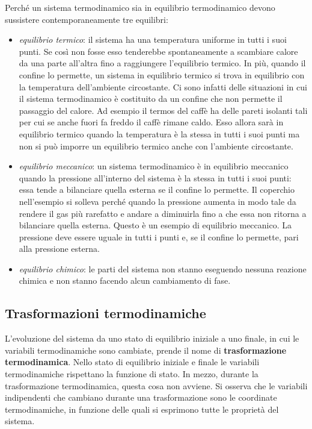 Perché un sistema termodinamico sia in equilibrio termodinamico devono sussistere contemporaneamente tre equilibri:

\begin{itemize}
	\item \emph{equilibrio termico}: il sistema ha una temperatura uniforme in tutti i suoi punti. Se così non fosse esso tenderebbe spontaneamente a scambiare calore da una parte all'altra fino a raggiungere l'equilibrio termico. In più, quando il confine lo permette, un sistema in equilibrio termico si trova in equilibrio con la temperatura dell'ambiente circostante. Ci sono infatti delle situazioni in cui il sistema termodinamico è costituito da un confine che non permette il passaggio del calore. Ad esempio il termos del caffè ha delle pareti isolanti tali per cui se anche fuori fa freddo il caffè rimane caldo. Esso allora sarà in equilibrio termico quando la temperatura è la stessa in tutti i suoi punti ma non si può imporre un equilibrio termico anche con l'ambiente circostante.
	\item \emph{equilibrio meccanico}: un sistema termodinamico è in equilibrio meccanico quando la pressione all'interno del sistema è la stessa in tutti i suoi punti: essa tende a bilanciare quella esterna se il confine lo permette. Il coperchio nell'esempio si solleva perché quando la pressione aumenta in modo tale da rendere il gas più rarefatto e andare a diminuirla fino a che essa non ritorna a bilanciare quella esterna. Questo è un esempio di equilibrio meccanico. La pressione deve essere uguale in tutti i punti e, se il confine lo permette, pari alla pressione esterna.
	\item \emph{equilibrio chimico}: le parti del sistema non stanno eseguendo nessuna reazione chimica e non stanno facendo alcun cambiamento di fase.
\end{itemize}

\subsection{Trasformazioni termodinamiche}

L'evoluzione del sistema da uno stato di equilibrio iniziale a uno finale, in cui le variabili termodinamiche sono cambiate, prende il nome di \textbf{trasformazione termodinamica}. Nello stato di equilibrio iniziale e finale le variabili termodinamiche rispettano la funzione di stato. In mezzo, durante la trasformazione termodinamica, questa cosa non avviene. Si osserva che le variabili indipendenti che cambiano durante una trasformazione sono le coordinate termodinamiche, in funzione delle quali si esprimono tutte le proprietà del sistema.

